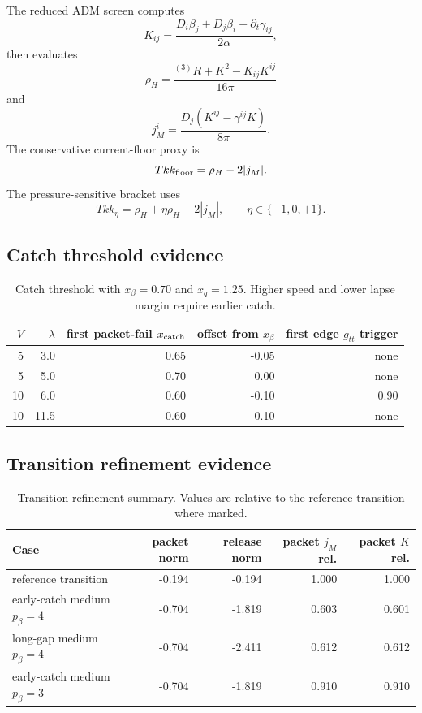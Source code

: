 \documentclass[11pt]{article}
\begin{document}
The reduced ADM screen computes
\begin{equation}
K_{ij}=\frac{D_i\beta_j+D_j\beta_i-\partial_t\gamma_{ij}}{2\alpha},
\end{equation}
then evaluates
\begin{equation}
\rho_H=\frac{{}^{(3)}R+K^2-K_{ij}K^{ij}}{16\pi}
\end{equation}
and
\begin{equation}
j_M^i=\frac{D_j(K^{ij}-\gamma^{ij}K)}{8\pi}.
\end{equation}
The conservative current-floor proxy is
\begin{equation}
Tkk_{\rm floor}=\rho_H-2|j_M|.
\end{equation}
The pressure-sensitive bracket uses
\begin{equation}
Tkk_\eta=\rho_H+\eta\rho_H-2|j_M|,
\qquad \eta\in\{-1,0,+1\}.
\end{equation}

\subsection{Catch threshold evidence}

\begin{table}[H]
\centering
\caption{Catch threshold with $x_\beta=0.70$ and $x_q=1.25$. Higher speed and lower lapse margin require earlier catch.}
\label{tab:catch_threshold}
\begin{tabular}{rrrrr}
\toprule
$V$ & $\lambda$ & first packet-fail $x_{\rm catch}$ & offset from $x_\beta$ & first edge $g_{tt}$ trigger \\
\midrule
5 & 3.0 & 0.65 & -0.05 & none \\
5 & 5.0 & 0.70 & 0.00 & none \\
10 & 6.0 & 0.60 & -0.10 & 0.90 \\
10 & 11.5 & 0.60 & -0.10 & none \\
\bottomrule
\end{tabular}
\end{table}

\subsection{Transition refinement evidence}

\begin{table}[H]
\centering
\caption{Transition refinement summary. Values are relative to the reference transition where marked.}
\label{tab:transition}
\begin{tabular}{lrrrr}
\toprule
Case & packet norm & release norm & packet $j_M$ rel. & packet $K$ rel. \\
\midrule
reference transition & -0.194 & -0.194 & 1.000 & 1.000 \\
early-catch medium $p_\beta=4$ & -0.704 & -1.819 & 0.603 & 0.601 \\
long-gap medium $p_\beta=4$ & -0.704 & -2.411 & 0.612 & 0.612 \\
early-catch medium $p_\beta=3$ & -0.704 & -1.819 & 0.910 & 0.910 \\
\bottomrule
\end{tabular}
\end{table}
\end{document}
